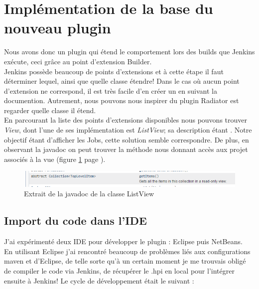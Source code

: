\section{Implémentation de la base du nouveau plugin}

Nous avons donc un plugin qui étend le comportement lors des builds que Jenkins exécute, ceci grâce au point d'extension Builder.\\
Jenkins possède beaucoup de points d'extensions et à cette étape il faut déterminer lequel, ainsi que quelle classe étendre! Dans le cas où aucun point d'extension ne correspond, il est très facile d'en créer un en suivant la documention. Autrement, nous pouvons nous inspirer du plugin Radiator est regarder quelle classe il étend.\\
En parcourant la liste des points d'extensions disponibles nous pouvons trouver \emph{View}, dont l'une de ses implémentation est \emph{ListView}; sa description étant . Notre objectif étant d'afficher les Jobs, cette solution semble correspondre. De plus, en observant la javadoc on peut trouver la méthode nous donnant accès aux projet associés à la vue (figure \ref{figure:listviewJavaDoc} page \pageref{figure:listviewJavaDoc}).

\begin{figure}[!h]
  \centering
      \includegraphics[width=\textwidth]{images/listviewJavaDoc.png}
  \caption{Extrait de la javadoc de la classe ListView}
	\label{figure:listviewJavaDoc}
\end{figure}



\subsection{Import du code dans l'IDE}
J'ai expérimenté deux IDE pour développer le plugin : Eclipse puis NetBeans.\\
En utilisant Eclipse j'ai rencontré beaucoup de problèmes liés aux configurations maven et d'Eclipse, de telle sorte qu'à un certain moment je me trouvais obligé de compiler le code via Jenkins, de récupérer le .hpi en local pour l'intégrer ensuite à Jenkins!
Le cycle de développement était le suivant :

